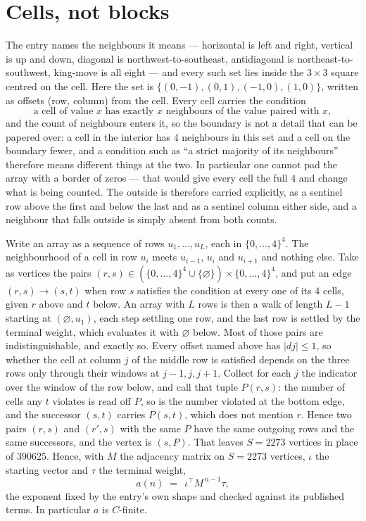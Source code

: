 \documentclass[11pt,a4paper]{article}
\theoremstyle{plain}
\theoremstyle{definition}
\begin{document}
\section{Cells, not blocks}

The entry names the neighbours it means --- horizontal is left and right, vertical is up and
down, diagonal is northwest-to-southeast, antidiagonal is northeast-to-southwest, king-move is
all eight --- and every such set lies inside the $3\times3$ square centred on the cell. Here
the set is $\{(0,-1), (0,1), (-1,0), (1,0)\}$, written as offsets (row, column) from the cell. Every cell carries
the condition
\[
\text{a cell of value }x\text{ has exactly }x\text{ neighbours of the value paired with }x,
\]
and the count of neighbours enters it, so the boundary is not a detail that can be papered
over: a cell in the interior has $4$ neighbours in this set and a cell on the boundary
fewer, and a condition such as ``a strict majority of its neighbours'' therefore means
different things at the two. In particular one cannot pad the array with a border of zeros ---
that would give every cell the full $4$ and change what is being counted. The outside is
therefore carried
explicitly, as a sentinel row above the first and below the last and as a sentinel column
either side, and a neighbour that falls outside is simply absent from both counts.

Write an array as a sequence of rows $u_1,\dots,u_L$, each in
$\{0,\dots,4\}^{4}$. The neighbourhood of a cell in row $u_i$ meets $u_{i-1}$,
$u_i$ and $u_{i+1}$ and nothing else. Take as vertices the pairs
$(r,s)\in(\{0,\dots,4\}^{4}\cup\{\varnothing\})\times\{0,\dots,4\}^{4}$,
and put an edge $(r,s)\to(s,t)$ when row $s$ satisfies the condition at every one of its
$4$ cells, given $r$ above and $t$ below. An array with $L$ rows is then a walk of length
$L-1$ starting at $(\varnothing,u_1)$, each step settling one row, and the last row is
settled by the terminal weight, which evaluates it with $\varnothing$ below. Most of those pairs are indistinguishable, and exactly so. Every offset named above has $|dj|\le 1$, so whether the cell at column $j$ of the middle row is satisfied depends on the three rows only through their windows at $j-1,j,j+1$. Collect for each $j$ the indicator over the window of the row below, and call that tuple $P(r,s)$: the number of cells any $t$ violates is read off $P$, so is the number violated at the bottom edge, and the successor $(s,t)$ carries $P(s,t)$, which does not mention $r$. Hence two pairs $(r,s)$ and $(r',s)$ with the same $P$ have the same outgoing rows and the same successors, and the vertex is $(s,P)$. That leaves $S=2273$ vertices in place of $390625$. Hence,
with $M$ the adjacency matrix on $S=2273$ vertices, $\iota$ the starting vector and $\tau$ the
terminal weight,
\[
a(n)\;=\;\,\iota^{\!\top}M^{\,n-1}\tau ,
\]
the exponent fixed by the entry's own shape and checked against its published terms. In
particular $a$ is $C$-finite.
\end{document}
